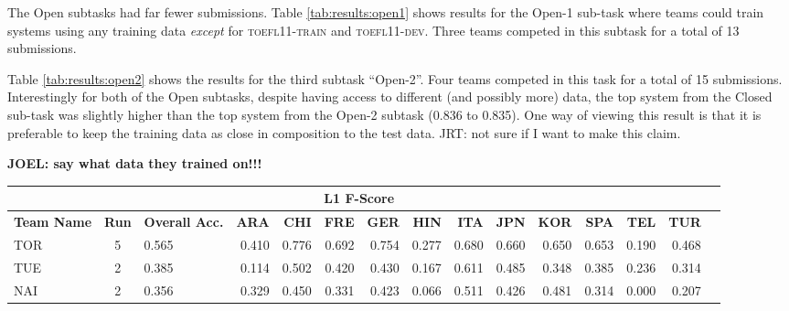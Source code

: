 \documentclass[11pt,letterpaper]{article}
\begin{document}
The Open subtasks had far fewer submissions.  Table \ref{tab:results:open1} shows
results for the Open-1 sub-task where teams could train systems using any training
data {\it except} for \textsc{toefl11-train} and \textsc{toefl11-dev}.  Three teams competed in this
subtask for a total of 13 submissions.

Table \ref{tab:results:open2} shows the results for the third subtask ``Open-2''.  Four
teams competed in this task for a total of 15 submissions.  Interestingly for both
of the Open subtasks, despite having access to different (and possibly more) data, the
top system from the Closed sub-task was slightly higher than the top system from the
Open-2 subtask (0.836 to 0.835).  One way of viewing this result is that it is
preferable to keep the training data as close in composition to the test data.  JRT:  not sure
if I want to make this claim.

{\bf JOEL: say what data they trained on!!!}

\begin{table*}
\begin{footnotesize}
\begin{tabular}{|p{1cm}|c|p{1cm}|r|r|r|r|r|r|r|r|r|r|r|r|}
\hline
\rowcolor{gray!50}
\multicolumn{3}{|c|}{} & \multicolumn{11}{c|}{\bf L1 F-Score}\\\hline
{\bf Team Name} & {\bf Run} & {\bf Overall Acc.} & {\bf ARA} & {\bf CHI} & {\bf FRE} & {\bf GER} & {\bf HIN} & {\bf ITA} & {\bf JPN} & {\bf KOR} & {\bf SPA} & {\bf TEL} & {\bf TUR}\\\hline
TOR & 5  & 0.565 & 0.410 & 0.776 & 0.692 & 0.754 & 0.277 & 0.680 & 0.660 & 0.650 & 0.653 & 0.190 & 0.468\\\hline
TUE & 2  & 0.385 & 0.114 & 0.502 & 0.420 & 0.430 & 0.167 & 0.611 & 0.485 & 0.348 & 0.385 & 0.236 & 0.314\\\hline
NAI & 2  & 0.356 & 0.329 & 0.450 & 0.331 & 0.423 & 0.066 & 0.511 & 0.426 & 0.481 & 0.314 & 0.000 & 0.207\\\hline
\end{tabular}
\caption{Results for open-1 task\label{tab:results:open1}}
\end{footnotesize}
\end{table*}
\end{document}
